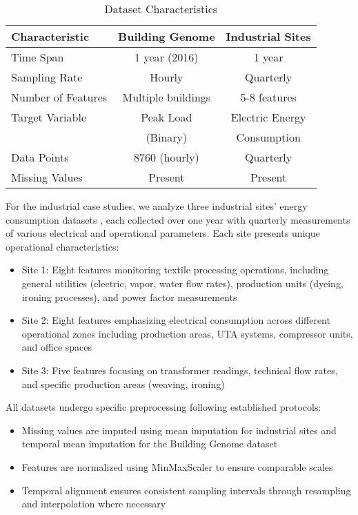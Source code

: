 \documentclass[final,5p,times,twocolumn,numbers]{elsarticle}
\begin{document}
\begin{table}[t]
\caption{Dataset Characteristics}
\label{tab:datasets}
\begin{tabular}{lcc}
\hline
\textbf{Characteristic} & \textbf{Building Genome} & \textbf{Industrial Sites} \\
\hline
Time Span & 1 year (2016) & 1 year \\
Sampling Rate & Hourly & Quarterly \\
Number of Features & Multiple buildings & 5-8 features \\
Target Variable & Peak Load & Electric Energy \\
                & (Binary) & Consumption \\
Data Points & 8760 (hourly) & Quarterly \\
Missing Values & Present & Present \\
\hline
\end{tabular}
\end{table}

For the industrial case studies, we analyze three industrial sites' energy consumption datasets \cite{energenius2023}, each collected over one year with quarterly measurements of various electrical and operational parameters. Each site presents unique operational characteristics:

\begin{itemize}
\item Site 1: Eight features monitoring textile processing operations, including general utilities (electric, vapor, water flow rates), production units (dyeing, ironing processes), and power factor measurements
  
\item Site 2: Eight features emphasizing electrical consumption across different operational zones including production areas, UTA systems, compressor units, and office spaces
  
\item Site 3: Five features focusing on transformer readings, technical flow rates, and specific production areas (weaving, ironing)
\end{itemize}

All datasets undergo specific preprocessing following established protocols:
\begin{itemize}
\item Missing values are imputed using mean imputation for industrial sites and temporal mean imputation for the Building Genome dataset
\item Features are normalized using MinMaxScaler to ensure comparable scales
\item Temporal alignment ensures consistent sampling intervals through resampling and interpolation where necessary
\end{itemize}
\end{document}
